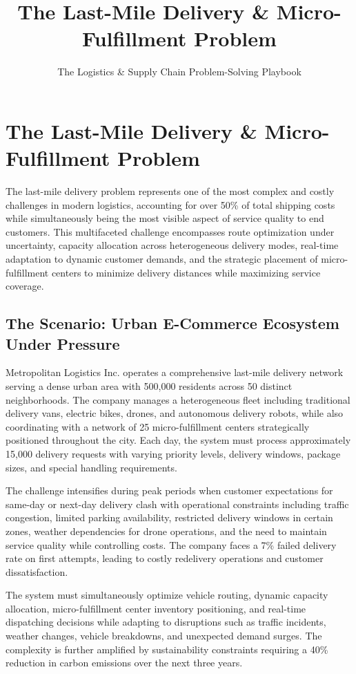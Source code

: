 \documentclass{article}
\title{The Last-Mile Delivery \& Micro-Fulfillment Problem}
\author{The Logistics \& Supply Chain Problem-Solving Playbook}
\date{}
\begin{document}
\maketitle

\section{The Last-Mile Delivery \& Micro-Fulfillment Problem}

The last-mile delivery problem represents one of the most complex and costly challenges in modern logistics, accounting for over 50\% of total shipping costs while simultaneously being the most visible aspect of service quality to end customers. This multifaceted challenge encompasses route optimization under uncertainty, capacity allocation across heterogeneous delivery modes, real-time adaptation to dynamic customer demands, and the strategic placement of micro-fulfillment centers to minimize delivery distances while maximizing service coverage.

\subsection{The Scenario: Urban E-Commerce Ecosystem Under Pressure}

Metropolitan Logistics Inc. operates a comprehensive last-mile delivery network serving a dense urban area with 500,000 residents across 50 distinct neighborhoods. The company manages a heterogeneous fleet including traditional delivery vans, electric bikes, drones, and autonomous delivery robots, while also coordinating with a network of 25 micro-fulfillment centers strategically positioned throughout the city. Each day, the system must process approximately 15,000 delivery requests with varying priority levels, delivery windows, package sizes, and special handling requirements.

The challenge intensifies during peak periods when customer expectations for same-day or next-day delivery clash with operational constraints including traffic congestion, limited parking availability, restricted delivery windows in certain zones, weather dependencies for drone operations, and the need to maintain service quality while controlling costs. The company faces a 7\% failed delivery rate on first attempts, leading to costly redelivery operations and customer dissatisfaction.

The system must simultaneously optimize vehicle routing, dynamic capacity allocation, micro-fulfillment center inventory positioning, and real-time dispatching decisions while adapting to disruptions such as traffic incidents, weather changes, vehicle breakdowns, and unexpected demand surges. The complexity is further amplified by sustainability constraints requiring a 40\% reduction in carbon emissions over the next three years.
\end{document}
